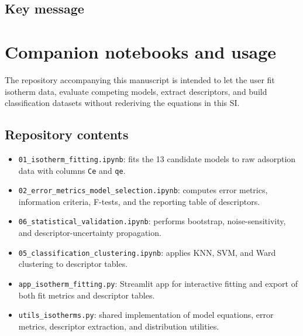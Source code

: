 \documentclass[journal=jacsat,manuscript=article]{achemso}
\begin{document}
\subsection{Key message}
\label{sec:si_key_message}

\noindent{}

\section{Companion notebooks and usage}
\label{sec:si_notebooks}

The repository accompanying this manuscript is intended to let the user fit
isotherm data, evaluate competing models, extract descriptors, and build
classification datasets without rederiving the equations in this SI.

\subsection{Repository contents}
\label{sec:si_notebook_contents}

\begin{itemize}
	\item \texttt{01\_isotherm\_fitting.ipynb}: fits the 13 candidate models to
	raw adsorption data with columns \texttt{Ce} and \texttt{qe}.
	\item \texttt{02\_error\_metrics\_model\_selection.ipynb}: computes error
	metrics, information criteria, F-tests, and the reporting table of
	descriptors.
	\item \texttt{06\_statistical\_validation.ipynb}: performs bootstrap,
	noise-sensitivity, and descriptor-uncertainty propagation.
	\item \texttt{05\_classification\_clustering.ipynb}: applies KNN, SVM, and
	Ward clustering to descriptor tables.
	\item \texttt{app\_isotherm\_fitting.py}: Streamlit app for interactive fitting
	and export of both fit metrics and descriptor tables.
	\item \texttt{utils\_isotherms.py}: shared implementation of model equations,
	error metrics, descriptor extraction, and distribution utilities.
\end{itemize}
\end{document}
